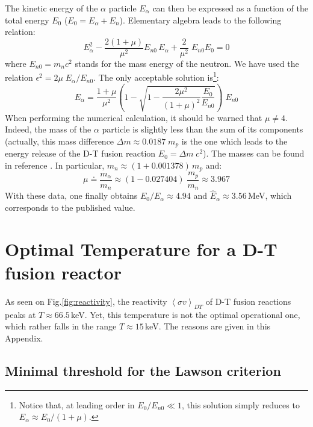 The kinetic energy of the $\alpha$ particle $E_\alpha$ can then be expressed as a function of the total energy $E_0$ ($E_0 =E_\alpha + E_n$). Elementary algebra leads to the following relation:
\begin{equation}
    E_\alpha^2 - \frac{2(1+\mu)}{\mu^2}E_{n0}\, E_\alpha + \frac{2}{\mu^2}\; E_{n0}E_0 = 0
\end{equation}
where $E_{n0} = m_nc^2$ stands for the mass energy of the neutron. We have used the relation $\epsilon^2 = 2\mu\; E_\alpha/E_{n0}$. The only acceptable solution is\footnote{Notice that, at leading order in $E_0/E_{n0}\ll1$, this solution simply reduces to $E_\alpha \approx E_0/(1+\mu)$.}:
\begin{equation}
    E_\alpha = \frac{1+\mu}{\mu^2}
    \left( 1 - \sqrt{1-\frac{2\mu^2}{(1+\mu)^2}\frac{E_0}{E_{n0}}}\right)\; E_{n0}
\end{equation}
When performing the numerical calculation, it should be warned that $\mu\neq 4$. 
Indeed, the mass of the $\alpha$ particle is slightly less than the sum of its components (actually, this mass difference $\Delta m \approx 0.0187\; m_p$ is the one which leads to the energy release of the D-T fusion reaction $E_0 = \Delta m\;c^2$). The masses can be found in reference \cite{Wesson2004}. In particular, $m_n \approx (1+0.001378)\, m_p$ and:
$$
    \mu \doteq \frac{m_\alpha}{m_n} \approx (1-0.027404)\; \frac{m_p}{m_n} \approx 3.967
$$
With these data, one finally obtains $E_0/E_\alpha \approx 4.94$ and $\hat E_\alpha \approx 3.56\,$MeV, which corresponds to the published value.  

\section{Optimal Temperature for a D-T fusion reactor}
\label{appendix:temperature}

As seen on Fig.\ref{fig:reactivity}, the reactivity $\left< \sigma v \right>_{DT}$ of D-T fusion reactions peaks at $T\approx 66.5\,$keV. Yet, this temperature is not the optimal operational one, which rather falls in the range $T\approx 15\,$keV. The reasons are given in this Appendix.


\subsection*{Minimal threshold for the Lawson criterion}

